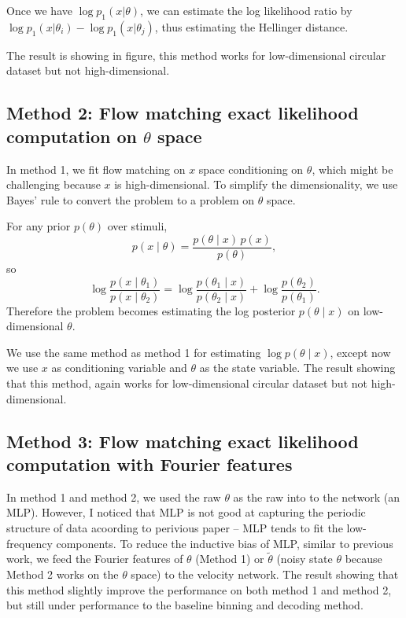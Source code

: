 Once we have $\log p_1(x | \theta)$, we can estimate the log likelihood ratio by $\log p_1(x | \theta_i) - \log p_1(x | \theta_j)$, thus estimating the Hellinger distance.

The result is showing in figure, this method works for low-dimensional circular dataset but not high-dimensional.

\subsection{Method 2: Flow matching exact likelihood computation on $\theta$ space}
In method 1, we fit flow matching on $x$ space conditioning on $\theta$, which might be challenging because $x$ is high-dimensional. To simplify the dimensionality, we use Bayes' rule to convert the problem to a problem on $\theta$ space. 

For any prior $p(\theta)$ over stimuli,
\begin{equation}
  p(x \mid \theta) = \frac{p(\theta \mid x)\, p(x)}{p(\theta)},
\end{equation}
so
\begin{equation}
  \log \frac{p(x \mid \theta_1)}{p(x \mid \theta_2)}
  = \log \frac{p(\theta_1 \mid x)}{p(\theta_2 \mid x)} + \log \frac{p(\theta_2)}{p(\theta_1)}.
\end{equation}
Therefore the problem becomes estimating the log posterior $p(\theta \mid x)$ on low-dimensional $\theta$.

We use the same method as method 1 for estimating $\log p(\theta \mid x)$, except now we use $x$ as conditioning variable and $\theta$ as the state variable. The result showing that this method, again works for low-dimensional circular dataset but not high-dimensional.

\subsection{Method 3: Flow matching exact likelihood computation with Fourier features}
In method 1 and method 2, we used the raw $\theta$ as the raw into to the network (an MLP). However, I noticed that MLP is not good at capturing the periodic structure of data acoording to perivious paper -- MLP tends to fit the low-frequency components. To reduce the inductive bias of MLP, similar to previous work, we feed the Fourier features of $\theta$ (Method 1) or $\tilde{\theta}$ (noisy state $\theta$ because Method 2 works on the $\theta$ space) to the velocity network. The result showing that this method slightly improve the performance on both method 1 and method 2, but still under performance to the baseline binning and decoding method.

